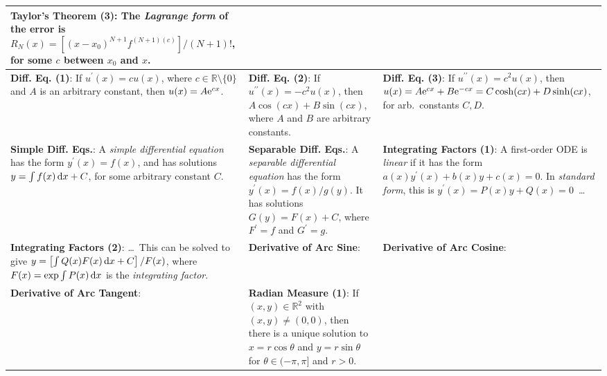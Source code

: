 \begin{tabular}{|m{.31\linewidth}|m{.31\linewidth}|m{.31\linewidth}|}
\textbf{Taylor's Theorem (3)}: The \emph{Lagrange form} of the error is
$R_N(x)=\left[(x-x_0)^{N+1}f^{(N+1)(c)}\right]/(N+1)!$, for some $c$ between
$x_0$ and $x$. \\

\hline

\textbf{Diff. Eq. (1)}: If $u^\prime(x)=cu(x)$, where
$c\in\mathbb{R}\setminus\{0\}$ and $A$ is an arbitrary constant, then
$u(x)=A\mathrm{e}^{cx}$. &

\textbf{Diff. Eq. (2)}: If $u^{\prime\prime}(x)=-c^2u(x)$, then
$A\cos(cx)+B\sin(cx)$, where $A$ and $B$ are arbitrary constants. &

\textbf{Diff. Eq. (3)}: If $u^{\prime\prime}(x)=c^2u(x)$, then
$u(x)=A\mathrm{e}^{cx}+B\mathrm{e}^{-cx}=C\cosh(cx)+D\sinh(cx)$, for arb.\
constants $C, D$. \\
\hline

\textbf{Simple Diff. Eqs.}: A \emph{simple differential equation} has the form
$y^\prime(x)=f(x)$, and has solutions $y=\int f(x)\, \mathrm{d}x+C$, for some
arbitrary constant $C$. &

\textbf{Separable Diff. Eqs.}: A \emph{separable differential equation} has the
form $y^\prime(x)=f(x)/g(y)$. It has solutions $G(y)=F(x)+C$, where $F^\prime=f$
and $G^\prime=g$. &

\textbf{Integrating Factors (1)}: A first-order ODE is \emph{linear} if it has
the form $a(x)y^\prime(x)+b(x)y+c(x)=0$. In \emph{standard form}, this is
$y^\prime(x)=P(x)y+Q(x)=0$\ \ldots \\
\hline

\textbf{Integrating Factors (2)}: \ldots\ This can be solved to give
$y=\left[\int Q(x)F(x)\,\mathrm{d}x+C\right]/F(x)$, where $F(x)=\exp\int
P(x)\,\mathrm{d}x$ is the \emph{integrating factor}. &

\textbf{Derivative of Arc Sine}: \smash{$\dfrac{\mathconst{d}}%
{\mathconst{d}x}\arcsin(x)=\dfrac{1}{\sqrt{1-x^2}}$} &

\textbf{Derivative of Arc Cosine}: \smash{$\dfrac{\mathconst{d}}%
{\mathconst{d}x}\arccos(x)=\dfrac{-1}{\sqrt{1-x^2}}$} \\

\hline

\textbf{Derivative of Arc Tangent}: \smash{$\dfrac{\mathconst{d}}%
{\mathconst{d}x}\arctan(x)=\dfrac{1}{1+x^2}$} &

\textbf{Radian Measure (1)}: If $(x,y)\in\mathbb{R}^2$ with $(x,y)\neq(0,0)$,
then there is a unique solution to $x=r\cos\theta$ and $y=r\sin\theta$ for
$\theta\in(-\pi,\pi]$ and $r>0$. &


\end{tabular}
